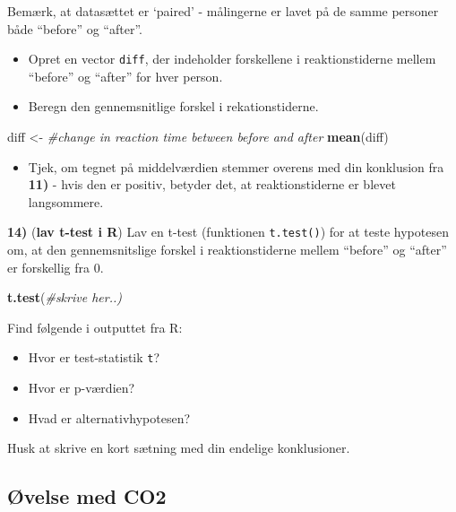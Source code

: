 \documentclass[
]{book}
\newenvironment{Shaded}{\begin{snugshade}}{\end{snugshade}}
\newcommand{\CommentTok}[1]{\textcolor[rgb]{0.37,0.37,0.37}{\textit{#1}}}
\newcommand{\FunctionTok}[1]{\textcolor[rgb]{0.27,0.27,0.27}{\textbf{#1}}}
\newcommand{\NormalTok}[1]{#1}
\newcommand{\OtherTok}[1]{\textcolor[rgb]{0.37,0.37,0.37}{#1}}
\providecommand{\tightlist}{%
  \setlength{\itemsep}{0pt}\setlength{\parskip}{0pt}}
\begin{document}
Bemærk, at datasættet er `paired' - målingerne er lavet på de samme personer både ``before'' og ``after''.

\begin{itemize}
\tightlist
\item
  Opret en vector \texttt{diff}, der indeholder forskellene i reaktionstiderne mellem ``before'' og ``after'' for hver person.
\item
  Beregn den gennemsnitlige forskel i rekationstiderne.
\end{itemize}

\begin{Shaded}
\begin{Highlighting}[]
\NormalTok{diff }\OtherTok{\textless{}{-}} \CommentTok{\#change in reaction time between before and after}
\FunctionTok{mean}\NormalTok{(diff)}
\end{Highlighting}
\end{Shaded}

\begin{itemize}
\tightlist
\item
  Tjek, om tegnet på middelværdien stemmer overens med din konklusion fra \textbf{11)} - hvis den er positiv, betyder det, at reaktionstiderne er blevet langsommere.
\end{itemize}

\textbf{14)} (\textbf{lav t-test i R}) Lav en t-test (funktionen \texttt{t.test()}) for at teste hypotesen om, at den gennemsnitslige forskel i reaktionstiderne mellem ``before'' og ``after'' er forskellig fra 0.

\begin{Shaded}
\begin{Highlighting}[]
\FunctionTok{t.test}\NormalTok{(}\CommentTok{\#skrive her..)}
\end{Highlighting}
\end{Shaded}

Find følgende i outputtet fra R:

\begin{itemize}
\tightlist
\item
  Hvor er test-statistik \texttt{t}?
\item
  Hvor er p-værdien?
\item
  Hvad er alternativhypotesen?
\end{itemize}

Husk at skrive en kort sætning med din endelige konklusioner.

\subsection{Øvelse med CO2}\label{uxf8velse-med-co2}
\end{document}
